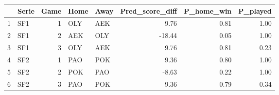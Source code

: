 \begin{table}[ht]
\centering
\begin{tabular}{rlrllrrr}
  \hline
 & Serie & Game & Home & Away & Pred\_score\_diff & P\_home\_win & P\_played \\ 
  \hline
1 & SF1 &   1 & OLY & AEK & 9.76 & 0.81 & 1.00 \\ 
  2 & SF1 &   2 & AEK & OLY & -18.44 & 0.05 & 1.00 \\ 
  3 & SF1 &   3 & OLY & AEK & 9.76 & 0.81 & 0.23 \\ 
  4 & SF2 &   1 & PAO & POK & 9.36 & 0.80 & 1.00 \\ 
  5 & SF2 &   2 & POK & PAO & -8.63 & 0.22 & 1.00 \\ 
  6 & SF2 &   3 & PAO & POK & 9.36 & 0.79 & 0.34 \\ 
   \hline
\end{tabular}
\end{table}
